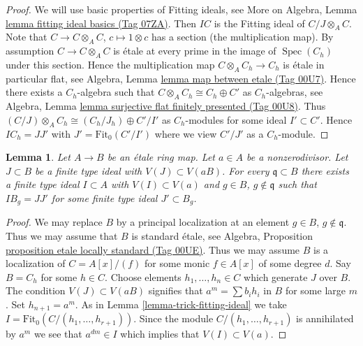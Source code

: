 \documentclass{amsart}
\theoremstyle{plain}
\newtheorem{lemma}[subsection]{Lemma}
\theoremstyle{definition}
\theoremstyle{remark}
\numberwithin{equation}{subsection}
\def\Spec{\mathop{\mathrm{Spec}}}
\begin{document}
\begin{proof}
We will use basic properties of Fitting ideals, see
More on Algebra, Lemma \href{https://stacks.math.columbia.edu/tag/07ZA}{lemma fitting ideal basics (Tag 07ZA)}.
Then $IC$ is the Fitting ideal of $C/J \otimes_A C$.
Note that $C \to C \otimes_A C$, $c \mapsto 1 \otimes c$ has a section
(the multiplication map). By assumption $C \to C \otimes_A C$ is \'etale
at every prime in the image of $\Spec(C_h)$ under this section.
Hence the multiplication map $C \otimes_A C_h \to C_h$ is \'etale
in particular flat, see Algebra, Lemma \href{https://stacks.math.columbia.edu/tag/00U7}{lemma map between etale (Tag 00U7)}.
Hence there exists a $C_h$-algebra such that
$C \otimes_A C_h \cong C_h \oplus C'$ as $C_h$-algebras, see
Algebra, Lemma \href{https://stacks.math.columbia.edu/tag/00U8}{lemma surjective flat finitely presented (Tag 00U8)}.
Thus $(C/J) \otimes_A C_h \cong (C_h/J_h) \oplus C'/I'$ as
$C_h$-modules for some ideal $I' \subset C'$.
Hence $IC_h = JJ'$ with $J' = \text{Fit}_0(C'/I')$ where we view
$C'/J'$ as a $C_h$-module.
\end{proof}


\begin{lemma}
\label{lemma-push-ideal}
Let $A \to B$ be an \'etale ring map. Let $a \in A$ be a nonzerodivisor.
Let $J \subset B$ be a finite type ideal with $V(J) \subset V(aB)$.
For every $\mathfrak q \subset B$ there exists a finite type ideal
$I \subset A$ with $V(I) \subset V(a)$ and
$g \in B$, $g \not \in \mathfrak q$ such that
$IB_g = JJ'$ for some finite type ideal $J' \subset B_g$.
\end{lemma}

\begin{proof}
We may replace $B$ by a principal localization at
an element $g \in B$, $g \not \in \mathfrak q$. Thus we may assume
that $B$ is standard \'etale, see
Algebra, Proposition \href{https://stacks.math.columbia.edu/tag/00UE}{proposition etale locally standard (Tag 00UE)}.
Thus we may assume $B$ is a localization
of $C = A[x]/(f)$ for some monic $f \in A[x]$ of some degree $d$.
Say $B = C_h$ for some $h \in C$. Choose elements $h_1, \ldots, h_n \in C$
which generate $J$
over $B$. The condition $V(J) \subset V(aB)$ signifies that
$a^m = \sum b_i h_i$ in $B$ for some large $m$. Set $h_{n + 1} = a^m$.
As in Lemma \ref{lemma-trick-fitting-ideal} we take
$I = \text{Fit}_0(C/(h_1, \ldots, h_{r + 1}))$.
Since the module $C/(h_1, \ldots, h_{r + 1})$
is annihilated by $a^m$ we see that $a^{dm} \in I$ which implies
that $V(I) \subset V(a)$.
\end{proof}
\end{document}
